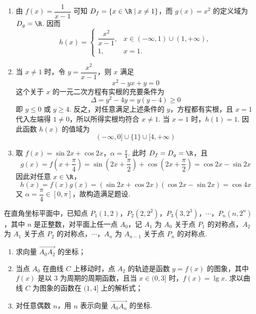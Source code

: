 \begin{solution}
\begin{enumerate}
\item 由 \(f(x)=\dfrac{1}{x-1}\) 可知 \(D_f=\{x\in\R\mid x\neq1\}\)，而 \(g(x)=x^2\) 的定义域为 \(D_g=\R\). 因而
\[
h(x)=\begin{cases}
\dfrac{x^2}{x-1},&x\in(-\infty,1)\cup(1,+\infty),\\
1,&x=1.
\end{cases}
\]

\item 当 \(x\neq1\) 时，令 \(y=\dfrac{x^2}{x-1}\)，则 \(x\) 满足
\[
x^2-yx+y=0
\]
这个关于 \(x\) 的一元二次方程有实根的充要条件为
\[
\Delta=y^2-4y=y(y-4)\geqslant0
\]
即 \(y\leqslant0\) 或 \(y\geqslant4\). 反之，对任意满足上述条件的 \(y\)，方程都有实根，且 \(x=1\) 代入左端得 \(1\neq0\)，所以所得实根均符合 \(x\neq1\). 当 \(x=1\) 时，\(h(1)=1\). 因此函数 \(h(x)\) 的值域为
\[
(-\infty,0]\cup\{1\}\cup[4,+\infty)
\]

\item 取 \(f(x)=\sin2x+\cos2x\)，\(\alpha=\frac{\pi}{4}\). 此时 \(D_f=D_g=\R\)，且
\[
g(x)=f\left(x+\frac{\pi}{4}\right)
=\sin\left(2x+\frac{\pi}{2}\right)+\cos\left(2x+\frac{\pi}{2}\right)
=\cos2x-\sin2x
\]
因此对任意 \(x\in\R\)，
\[
h(x)=f(x)g(x)=(\sin2x+\cos2x)(\cos2x-\sin2x)=\cos4x
\]
又 \(\alpha=\dfrac{\pi}{4}\in[0,\pi]\)，故构造满足题设.
\end{enumerate}
\end{solution}

\begin{problem}
在直角坐标平面中，已知点 \(P_{1}(1,2)\)，\(P_{2}(2,2^{2})\)，\(P_{3}(3,2^{3})\)，\(\cdots\)，\(P_{n}(n,2^{n})\)，其中 \(n\) 是正整数，对平面上任一点 \(A_{0}\)，记 \(A_{1}\) 为 \(A_{0}\) 关于点 \(P_{1}\) 的对称点，\(A_{2}\) 为 \(A_{1}\) 关于点 \(P_{2}\) 的对称点，\(\cdots\)，\(A_{n}\) 为 \(A_{n-1}\) 关于点 \(P_{n}\) 的对称点.

\begin{enumerate}
\item 求向量 \(\overrightarrow{A_{0}A_{2}}\) 的坐标；
\item 当点 \(A_{0}\) 在曲线 \(C\) 上移动时，点 \(A_{2}\) 的轨迹是函数 \(y = f(x)\) 的图象，其中 \(f(x)\) 是以 3 为周期的周期函数，且当 \(x \in (0,3]\) 时，\(f(x) = \lg x\). 求以曲线 \(C\) 为图象的函数在 \((1,4]\) 上的解析式；
\item 对任意偶数 \(n\)，用 \(n\) 表示向量 \(\overrightarrow{A_{0}A_{n}}\) 的坐标.
\end{enumerate}
\end{problem}


